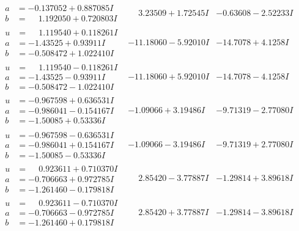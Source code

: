 \documentclass[1p]{elsarticle_modified}
\theoremstyle{definition}
\begin{document}
$$\begin{array}{c|c|c}
\begin{aligned}
a &= -0.137052 + 0.887085 I \\
b &= \phantom{-}1.192050 + 0.720803 I\end{aligned}
 & \phantom{-}3.23509 + 1.72545 I & -0.63608 - 2.52233 I \\ \hline\begin{aligned}
u &= \phantom{-}1.119540 + 0.118261 I \\
a &= -1.43525 + 0.93911 I \\
b &= -0.508472 + 1.022410 I\end{aligned}
 & -11.18060 - 5.92010 I & -14.7078 + 4.1258 I \\ \hline\begin{aligned}
u &= \phantom{-}1.119540 - 0.118261 I \\
a &= -1.43525 - 0.93911 I \\
b &= -0.508472 - 1.022410 I\end{aligned}
 & -11.18060 + 5.92010 I & -14.7078 - 4.1258 I \\ \hline\begin{aligned}
u &= -0.967598 + 0.636531 I \\
a &= -0.986041 - 0.154167 I \\
b &= -1.50085 + 0.53336 I\end{aligned}
 & -1.09066 + 3.19486 I & -9.71319 - 2.77080 I \\ \hline\begin{aligned}
u &= -0.967598 - 0.636531 I \\
a &= -0.986041 + 0.154167 I \\
b &= -1.50085 - 0.53336 I\end{aligned}
 & -1.09066 - 3.19486 I & -9.71319 + 2.77080 I \\ \hline\begin{aligned}
u &= \phantom{-}0.923611 + 0.710370 I \\
a &= -0.706663 + 0.972785 I \\
b &= -1.261460 - 0.179818 I\end{aligned}
 & \phantom{-}2.85420 - 3.77887 I & -1.29814 + 3.89618 I \\ \hline\begin{aligned}
u &= \phantom{-}0.923611 - 0.710370 I \\
a &= -0.706663 - 0.972785 I \\
b &= -1.261460 + 0.179818 I\end{aligned}
 & \phantom{-}2.85420 + 3.77887 I & -1.29814 - 3.89618 I \\ \hline\begin{aligned}

\end{aligned}
\end{array}$$
\end{document}
